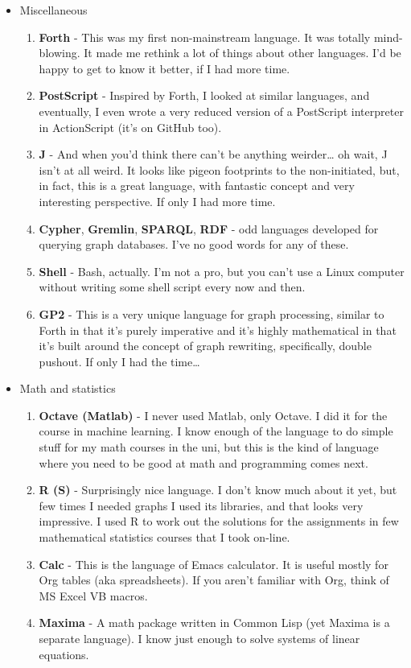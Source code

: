 \documentclass[oneside]{memoir}
\begin{document}
\begin{itemize}
\item Miscellaneous
\begin{enumerate}
\item \textbf{Forth} - This was my first non-mainstream language.  It was totally
mind-blowing.  It made me rethink a lot of things about other languages.
I'd be happy to get to know it better, if I had more time.
\item \textbf{PostScript} - Inspired by Forth, I looked at similar languages, and
eventually, I even wrote a very reduced version of a PostScript
interpreter in ActionScript (it's on GitHub too).
\item \textbf{J} - And when you'd think there can't be anything weirder\ldots{} oh wait,
J isn't at all weird.  It looks like pigeon footprints to the
non-initiated, but, in fact, this is a great language, with fantastic
concept and very interesting perspective.  If only I had more time.
\item \textbf{Cypher}, \textbf{Gremlin}, \textbf{SPARQL}, \textbf{RDF} - odd languages developed for
querying graph databases.  I've no good words for any of these.
\item \textbf{Shell} - Bash, actually. I'm not a pro, but you can't use a Linux
computer without writing some shell script every now and then.
\item \textbf{GP2} - This is a very unique language for graph processing, similar
to Forth in that it's purely imperative and it's highly mathematical
in that it's built around the concept of graph rewriting, specifically,
double pushout.  If only I had the time\ldots{}
\end{enumerate}

\item Math and statistics
\begin{enumerate}
\item \textbf{Octave (Matlab)} - I never used Matlab, only Octave.  I did it for the
course in machine learning.  I know enough of the language to do simple
stuff for my math courses in the uni, but this is the kind of language
where you need to be good at math and programming comes next.
\item \textbf{R (S)} - Surprisingly nice language.  I don't know much about it yet, but
few times I needed graphs I used its libraries, and that looks very
impressive.  I used R to work out the solutions for the assignments in
few mathematical statistics courses that I took on-line.
\item \textbf{Calc} - This is the language of Emacs calculator.  It is useful mostly
for Org tables (aka spreadsheets).  If you aren't familiar with Org,
think of MS Excel VB macros.
\item \textbf{Maxima} - A math package written in Common Lisp (yet Maxima is a 
separate language).  I know just enough to solve systems of linear
equations.
\end{enumerate}


\end{itemize}
\end{document}
